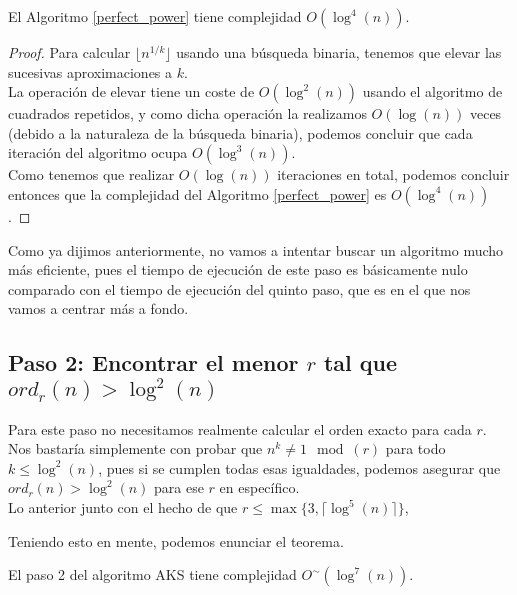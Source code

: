 \begin{teorema}
	El Algoritmo \ref{perfect_power} tiene complejidad $O(\log^4(n))$.
\end{teorema}

\begin{proof}
	Para calcular $\lfloor n^{1/k} \rfloor$ usando una búsqueda binaria, tenemos que elevar las sucesivas aproximaciones a $k$.\\
	
	La operación de elevar tiene un coste de $O(\log^2(n))$ usando el algoritmo de cuadrados repetidos, y como dicha operación la realizamos $O(\log(n))$ veces (debido a la naturaleza de la búsqueda binaria), podemos concluir que cada iteración del algoritmo ocupa $O(\log^3(n))$.\\
	
	Como tenemos que realizar $O(\log(n))$ iteraciones en total, podemos concluir entonces que la complejidad del Algoritmo \ref{perfect_power} es $O(\log^4(n))$.
\end{proof}

Como ya dijimos anteriormente, no vamos a intentar buscar un algoritmo mucho más eficiente, pues el tiempo de ejecución de este paso es básicamente nulo comparado con el tiempo de ejecución del quinto paso, que es en el que nos vamos a centrar más a fondo.

\subsection{Paso 2: Encontrar el menor $r$ tal que $ord_r(n) > \log^2(n)$}

Para este paso no necesitamos realmente calcular el orden exacto para cada $r$. Nos bastaría simplemente con probar que $n^k \neq 1 \mod(r)$ para todo $k \leq \log^2(n)$, pues si se cumplen todas esas igualdades, podemos asegurar que $ord_r(n) > \log^2(n)$ para ese $r$ en específico.\\

Lo anterior junto con el hecho de que $r \leq \max\{3, \lceil \log^5(n) \rceil\}$,

Teniendo esto en mente, podemos enunciar el teorema.

\begin{teorema}
	El paso 2 del algoritmo AKS tiene complejidad $O^\sim(\log^7(n))$.
\end{teorema}

